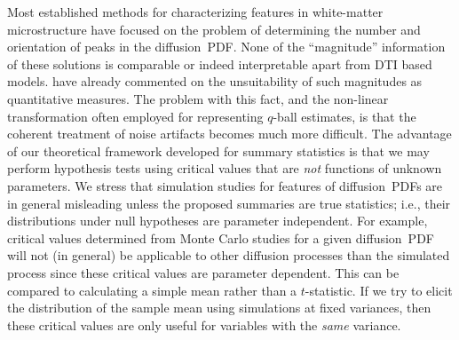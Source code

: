 \documentclass[dvips,aoas,preprint]{imsart}
\numberwithin{equation}{section}
\theoremstyle{plain}
\begin{document}
Most established methods for characterizing features in white-matter
microstructure have focused on the problem of determining the number
and orientation of peaks in the diffusion~PDF.  None of the
``magnitude'' information of these solutions is comparable or indeed
interpretable apart from DTI based models.  \citet{Savadjiev2006} have
already commented on the unsuitability of such magnitudes as
quantitative measures.  The problem with this fact, and the non-linear
transformation often employed for representing $q$-ball estimates, is
that the coherent treatment of noise artifacts becomes much more
difficult.  The advantage of our theoretical framework developed for
summary statistics is that we may perform hypothesis tests using
critical values that are {\em not} functions of unknown parameters.
We stress that simulation studies for features of diffusion~PDFs are
in general misleading unless the proposed summaries are true
statistics; i.e., their distributions under null hypotheses are
parameter independent.  For example, critical values determined from
Monte Carlo studies for a given diffusion~PDF will not (in general) be
applicable to other diffusion processes than the simulated process
since these critical values are parameter dependent.  This can be
compared to calculating a simple mean rather than a $t$-statistic.  If
we try to elicit the distribution of the sample mean using simulations
at fixed variances, then these critical values are only useful for
variables with the {\em same} variance.
\end{document}
